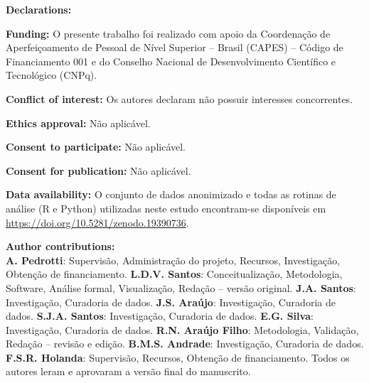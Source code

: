 \documentclass[12pt,a4paper]{article}
\begin{document}
\bigskip

\noindent\textbf{Declarations:}

\medskip

\noindent\textbf{Funding:} O presente trabalho foi realizado com apoio da Coordenação de Aperfeiçoamento de Pessoal de Nível Superior -- Brasil (CAPES) -- Código de Financiamento 001 e do Conselho Nacional de Desenvolvimento Científico e Tecnológico (CNPq).

\medskip

\noindent\textbf{Conflict of interest:} Os autores declaram não possuir interesses concorrentes.

\medskip

\noindent\textbf{Ethics approval:} Não aplicável.

\medskip

\noindent\textbf{Consent to participate:} Não aplicável.

\medskip

\noindent\textbf{Consent for publication:} Não aplicável.

\medskip

\noindent\textbf{Data availability:} O conjunto de dados anonimizado e todas as rotinas de análise (R e Python) utilizadas neste estudo encontram-se disponíveis em \url{https://doi.org/10.5281/zenodo.19390736}.

\medskip

\noindent\textbf{Author contributions:}\\
\textbf{A. Pedrotti}: Supervisão, Administração do projeto, Recursos, Investigação, Obtenção de financiamento.
\textbf{L.D.V. Santos}: Conceitualização, Metodologia, Software, Análise formal, Visualização, Redação -- versão original.
\textbf{J.A. Santos}: Investigação, Curadoria de dados.
\textbf{J.S. Araújo}: Investigação, Curadoria de dados.
\textbf{S.J.A. Santos}: Investigação, Curadoria de dados.
\textbf{E.G. Silva}: Investigação, Curadoria de dados.
\textbf{R.N. Araújo Filho}: Metodologia, Validação, Redação -- revisão e edição.
\textbf{B.M.S. Andrade}: Investigação, Curadoria de dados.
\textbf{F.S.R. Holanda}: Supervisão, Recursos, Obtenção de financiamento.
Todos os autores leram e aprovaram a versão final do manuscrito.
\end{document}
